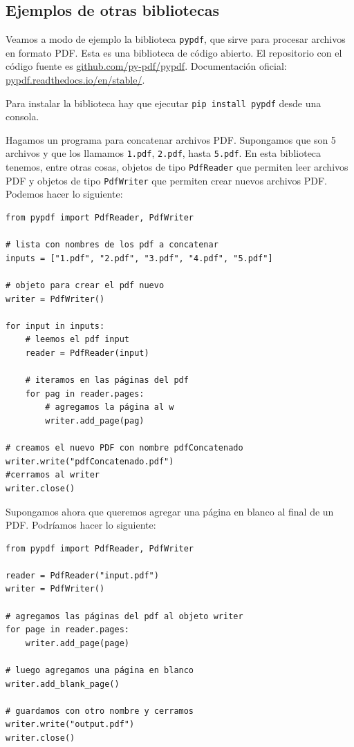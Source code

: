 \documentclass[a4paper, 12pt]{report}
\theoremstyle{definition}
\begin{document}
\subsection{Ejemplos de otras bibliotecas}

Veamos a modo de ejemplo la biblioteca {\tt pypdf}, que sirve para procesar archivos en formato PDF. Esta es una biblioteca de código abierto. El repositorio con el código fuente es \href{https://github.com/py-pdf/pypdf}{github.com/py-pdf/pypdf}. Documentación oficial: \href{https://pypdf.readthedocs.io/en/stable/}{pypdf.readthedocs.io/en/stable/}.

Para instalar la biblioteca hay que ejecutar {\tt pip install pypdf} desde una consola.

Hagamos un programa para concatenar archivos PDF. Supongamos que son 5 archivos y que los llamamos {\tt 1.pdf}, {\tt 2.pdf}, hasta {\tt 5.pdf}. En esta biblioteca tenemos, entre otras cosas, objetos de tipo {\tt PdfReader} que permiten leer archivos PDF y objetos de tipo {\tt PdfWriter} que permiten crear nuevos archivos PDF. Podemos hacer lo siguiente:
\begin{verbatim}
from pypdf import PdfReader, PdfWriter

# lista con nombres de los pdf a concatenar
inputs = ["1.pdf", "2.pdf", "3.pdf", "4.pdf", "5.pdf"]

# objeto para crear el pdf nuevo
writer = PdfWriter()

for input in inputs:
    # leemos el pdf input
    reader = PdfReader(input)
    
    # iteramos en las páginas del pdf
    for pag in reader.pages:
        # agregamos la página al w
        writer.add_page(pag)

# creamos el nuevo PDF con nombre pdfConcatenado
writer.write("pdfConcatenado.pdf")
#cerramos al writer
writer.close()
\end{verbatim}

Supongamos ahora que queremos agregar una página en blanco al final de un PDF. Podríamos hacer lo siguiente:
\begin{verbatim}
from pypdf import PdfReader, PdfWriter

reader = PdfReader("input.pdf")
writer = PdfWriter()

# agregamos las páginas del pdf al objeto writer
for page in reader.pages:
    writer.add_page(page)

# luego agregamos una página en blanco
writer.add_blank_page()

# guardamos con otro nombre y cerramos
writer.write("output.pdf")
writer.close()
\end{verbatim}
\end{document}
